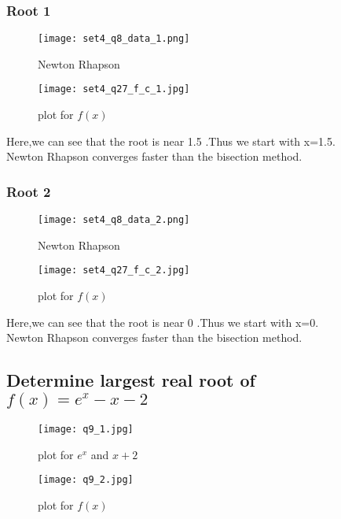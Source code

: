 \documentclass[a4paper]{article}
\begin{document}
        \subsubsection{Root 1}
            \begin{figure}[!htbp]
              \centering
              \begin{minipage}[b]{0.45\textwidth}
\texttt{[image: set4\_q8\_data\_1.png]}
                \caption{Newton Rhapson }
              \end{minipage}
              \hfill
              \begin{minipage}[b]{0.45\textwidth}
                \texttt{[image: set4\_q27\_f\_c\_1.jpg]}
                \caption{plot for $f(x)$}
              \end{minipage}
            \end{figure}
            \Large{Here,we can see that the root is near 1.5 .Thus we start with x=1.5.\\Newton Rhapson converges faster than the bisection method.}
            \newpage
            \subsubsection{Root 2}
             \begin{figure}[!htbp]
              \centering
              \begin{minipage}[b]{0.45\textwidth}
\texttt{[image: set4\_q8\_data\_2.png]}
                \caption{Newton Rhapson }
              \end{minipage}
              \hfill
              \begin{minipage}[b]{0.45\textwidth}
                \texttt{[image: set4\_q27\_f\_c\_2.jpg]}
                \caption{plot for $f(x)$}
              \end{minipage}
            \end{figure}
             \Large{Here,we can see that the root is near 0 .Thus we start with x=0.\\Newton Rhapson converges faster than the bisection method.}
            \newpage
            
            
            
    \subsection{Determine largest real root of $f(x)=e^x-x-2$}
            \begin{figure}[!htbp]
              \centering
              \begin{minipage}[b]{0.45\textwidth}
                \texttt{[image: q9\_1.jpg]}
                 \caption{plot for $e^x$ and $ x+2$ }
              \end{minipage}
              \hfill
              \begin{minipage}[b]{0.45\textwidth}
                \texttt{[image: q9\_2.jpg]}
                \caption{plot for $f(x)$}
              \end{minipage}
            \end{figure}
\end{document}
